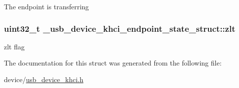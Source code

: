 The endpoint is transferring \hypertarget{struct__usb__device__khci__endpoint__state__struct_a98ab62a59c29d678cb1a0b61412326bd}{
\subsubsection[{zlt}]{\setlength{\rightskip}{0pt plus 5cm}uint32\-\_\-t \-\_\-usb\-\_\-device\-\_\-khci\-\_\-endpoint\-\_\-state\-\_\-struct\-::zlt}}\label{struct__usb__device__khci__endpoint__state__struct_a98ab62a59c29d678cb1a0b61412326bd}
zlt flag 

The documentation for this struct was generated from the following file\-:\begin{DoxyCompactItemize}
\item 
device/\hyperlink{usb__device__khci_8h}{usb\-\_\-device\-\_\-khci.\-h}\end{DoxyCompactItemize}
